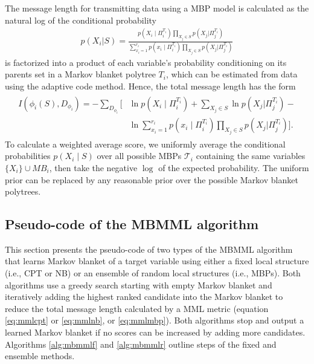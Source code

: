 The message length for transmitting data using a MBP model is calculated as the natural log of the conditional probability
\begin{align*}
p(X_i|S) = \frac{p(X_i \mid \Pi_i^{T_i})\prod_{X_j \in S} p(X_j | \Pi_j^{T_i})}{\sum_{x_i=1}^{r_i}p(x_i \mid \Pi_i^{T_i})\prod_{X_j \in S} p(X_j | \Pi_j^{T_i})}
\end{align*}
is factorized into a product of each variable's probability conditioning on its parents set in a Markov blanket polytree $T_i$, which can be estimated from data using the adaptive code method. Hence, the total message length has the form 
\begin{align}
\label{eq:mmlmbp}
\begin{split}
I(\phi_i(S), D_{\phi_i}) = -\sum_{D_{\phi_i}} \biggl[
&\ln p(X_i\mid \Pi_i^{T_i}) + \sum_{X_j \in S} \ln p(X_j | \Pi_j^{T_i}) - \\
&\ln \sum_{x_i=1}^{r_i}p(x_i \mid \Pi_i^{T_i})\prod_{X_j \in S} p(X_j | \Pi_j^{T_i})
\biggr].
\end{split}
\end{align}
To calculate a weighted average score, we uniformly average the conditional probabilities $p(X_i\mid S)$ over all possible MBPs  $\mathcal{T}_i$ containing the same variables $\{X_i\} \cup MB_i$, then take the negative $\log$ of the expected probability. The uniform prior can be replaced by any reasonable prior over the possible Markov blanket polytrees.


\subsection{Pseudo-code of the MBMML algorithm}
This section presents the pseudo-code of two types of the MBMML algorithm that learns Markov blanket of a target variable using either a fixed local structure (i.e., CPT or NB) or an ensemble of random local structures (i.e., MBPs). Both algorithms use a greedy search starting with empty Markov blanket and iteratively adding the highest ranked candidate into the Markov blanket to reduce the total message length calculated by a MML metric (equation \ref{eq:mmlcpt} or \ref{eq:mmlnb}, or \ref{eq:mmlmbp}). Both algorithms stop and output a learned Markov blanket if no scores can be increased by adding more candidates. Algorithms \ref{alg:mbmmlf} and \ref{alg:mbmmlr} outline steps of the fixed and ensemble methods.


